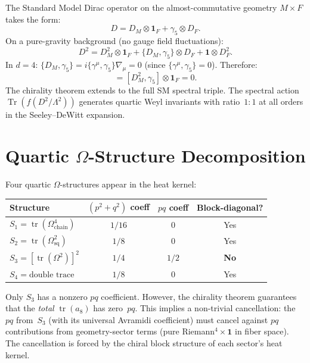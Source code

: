 \documentclass[12pt,a4paper]{article}
\newcommand{\Tr}{\operatorname{Tr}}
\newcommand{\tr}{\operatorname{tr}}
\newcommand{\Lam}{\Lambda}
\begin{document}
The Standard Model Dirac operator on the almost-commutative geometry
$M \times F$ takes the form:
\begin{equation}
  D = D_M \otimes \mathbf{1}_F + \gamma_5 \otimes D_F.
\end{equation}
On a pure-gravity background (no gauge field fluctuations):
\begin{equation}
  D^2 = D_M^2 \otimes \mathbf{1}_F + \{D_M, \gamma_5\} \otimes D_F
  + \mathbf{1} \otimes D_F^2.
\end{equation}
In $d = 4$: $\{D_M, \gamma_5\} = i\{\gamma^\mu, \gamma_5\}\nabla_\mu = 0$
(since $\{\gamma^\mu, \gamma_5\} = 0$).  Therefore:
\begin{equation}
  [D^2,\, \gamma_5 \otimes \mathbf{1}_F] = [D_M^2, \gamma_5] \otimes \mathbf{1}_F = 0.
\end{equation}
The chirality theorem extends to the full SM spectral triple.  The spectral action
$\Tr(f(D^2/\Lam^2))$ generates quartic Weyl invariants with ratio~$1{:}1$ at
all orders in the Seeley--DeWitt expansion.

\section{Quartic $\Omega$-Structure Decomposition}
\label{sec:omega}

Four quartic $\Omega$-structures appear in the heat kernel:

\begin{center}
\begin{tabular}{lccc}
\toprule
Structure & $(p^2{+}q^2)$ coeff & $pq$ coeff & Block-diagonal? \\
\midrule
$S_1 = \tr(\Omega^4_{\mathrm{chain}})$ & $1/16$ & $0$ & Yes \\
$S_2 = \tr(\Omega_{\mathrm{sq}}^2)$ & $1/8$ & $0$ & Yes \\
$S_3 = [\tr(\Omega^2)]^2$ & $1/4$ & $1/2$ & \textbf{No} \\
$S_4 = \text{double trace}$ & $1/8$ & $0$ & Yes \\
\bottomrule
\end{tabular}
\end{center}

Only $S_3$ has a nonzero $pq$ coefficient.  However, the chirality theorem
guarantees that the \emph{total} $\tr(a_8)$ has zero~$pq$.  This implies
a non-trivial cancellation: the $pq$ from~$S_3$ (with its universal Avramidi
coefficient) must cancel against $pq$ contributions from geometry-sector
terms (pure Riemann$^4 \times \mathbf{1}$ in fiber space).  The cancellation
is forced by the chiral block structure of each sector's heat kernel.
\end{document}
